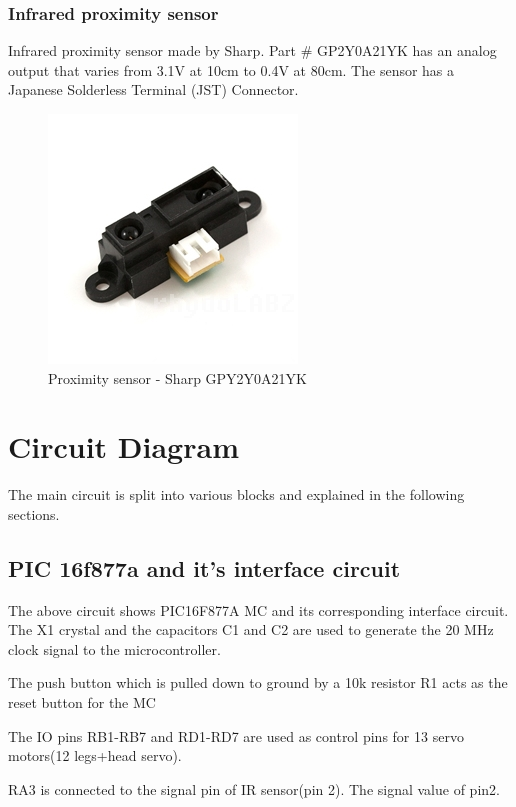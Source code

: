 \documentclass{report}
\begin{document}
\subsubsection{Infrared proximity sensor}
Infrared proximity sensor made by Sharp. Part \#  GP2Y0A21YK has an analog output that varies from 3.1V at 10cm to 0.4V at 80cm. The sensor has a Japanese Solderless Terminal (JST) Connector. 
\begin{figure}[h!]
\centering
\includegraphics[scale=0.255]{ir.jpg}
\caption{Proximity sensor - Sharp GPY2Y0A21YK}
\label{fig28}
\end{figure}
\section{Circuit Diagram}
The main circuit is split into various blocks and explained in the following sections.
\subsection{PIC 16f877a and it's interface circuit}
The above circuit shows PIC16F877A MC and its corresponding interface circuit. The X1 crystal and the capacitors C1 and C2 are used to generate the 20 MHz clock signal to the microcontroller.

The push button which is pulled down to ground by a 10k resistor R1 acts as the reset button for the MC

The IO pins RB1-RB7 and RD1-RD7 are used as control pins for 13 servo motors(12 legs+head servo).

RA3 is connected to the signal pin of IR sensor(pin 2). The signal value of pin2.
\end{document}
